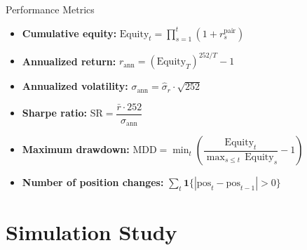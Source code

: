 \documentclass[10pt, aspectratio=169]{beamer}
\begin{document}
\begin{frame}{Performance Metrics}
  \begin{itemize}
    \item \textbf{Cumulative equity:}
      $\text{Equity}_t = \prod_{s=1}^{t}(1 + r_s^{\text{pair}})$
    \item \textbf{Annualized return:}
      $r_{\text{ann}} = \left(\text{Equity}_T\right)^{252/T} - 1$
    \item \textbf{Annualized volatility:}
      $\sigma_{\text{ann}} = \hat{\sigma}_r \cdot \sqrt{252}$
    \item \textbf{Sharpe ratio:}
      $\text{SR} = \dfrac{\bar{r} \cdot 252}{\sigma_{\text{ann}}}$
    \item \textbf{Maximum drawdown:}
      $\text{MDD} = \min_t\left(\dfrac{\text{Equity}_t}
        {\max_{s \le t}\,\text{Equity}_s} - 1\right)$
    \item \textbf{Number of position changes:}
      $\sum_{t} \mathbf{1}\{|\text{pos}_t - \text{pos}_{t-1}| > 0\}$
  \end{itemize}
\end{frame}

\section{Simulation Study}
\end{document}

